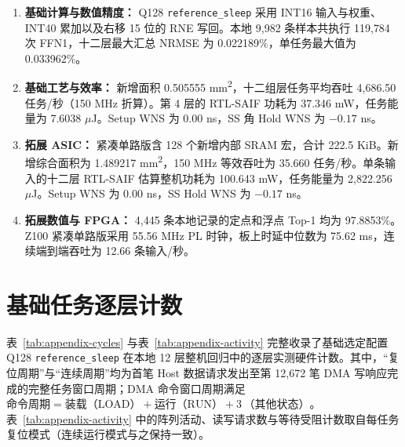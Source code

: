 \documentclass[UTF8,a4paper,zihao=-4,fontset=none,openany,oneside]{ctexrep}
\newcommand{\Q}{\texttt{reference\_\allowbreak{}sleep}}
\begin{document}
\begin{enumerate}
\item \textbf{基础计算与数值精度：} Q128 \Q{} 采用 INT16 输入与权重、INT40 累加以及右移 15 位的 RNE 写回。本地 9,982 条样本共执行 119,784 次 FFN1，十二层最大汇总 NRMSE 为 0.022189\%，单任务最大值为 0.033962\%。
\item \textbf{基础工艺与效率：} 新增面积 0.505555 mm\textsuperscript{2}，十二组层任务平均吞吐 4,686.50 任务/秒（150 MHz 折算）。第 4 层的 RTL-SAIF 功耗为 37.346 mW，任务能量为 7.6038 $\mu$J。Setup WNS 为 0.00 ns，SS 角 Hold WNS 为 $-0.17$ ns。
\item \textbf{拓展 ASIC：} 紧凑单路版含 128 个新增内部 SRAM 宏，合计 222.5 KiB。新增综合面积为 1.489217 mm\textsuperscript{2}，150 MHz 等效吞吐为 35.660 任务/秒。单条输入的十二层 RTL-SAIF 估算整机功耗为 100.643 mW，任务能量为 2,822.256 $\mu$J。Setup WNS 为 0.00 ns，SS Hold WNS 为 $-0.17$ ns。
\item \textbf{拓展数值与 FPGA：} 4,445 条本地记录的定点和浮点 Top-1 均为 97.8853\%。Z100 紧凑单路版采用 55.56 MHz PL 时钟，板上时延中位数为 75.62 ms，连续端到端吞吐为 12.66 条输入/秒。
\end{enumerate}

\chapter{基础任务逐层计数}\label{app:counts}

表~\ref{tab:appendix-cycles} 与表~\ref{tab:appendix-activity} 完整收录了基础选定配置 Q128 \Q{} 在本地 12 层整机回归中的逐层实测硬件计数。其中，“复位周期”与“连续周期”均为首笔 Host 数据请求发出至第 12,672 笔 DMA 写响应完成的完整任务窗口周期；DMA 命令窗口周期满足 $\text{命令周期} = \text{装载（LOAD）} + \text{运行（RUN）} + 3\,\text{（其他状态）}$。表~\ref{tab:appendix-activity} 中的阵列活动、读写请求数与等待受阻计数取自每任务复位模式（连续运行模式与之保持一致）。
\end{document}
